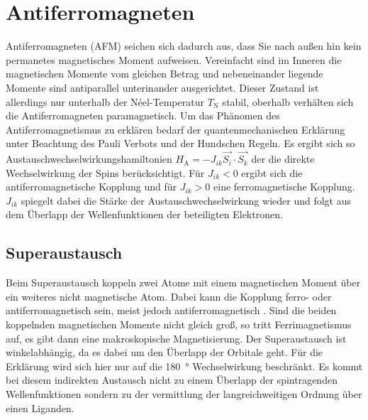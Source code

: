    \section{Antiferromagneten}
        Antiferromagneten (AFM) seichen sich dadurch aus, dass Sie nach außen hin kein permanetes magnetisches Moment aufweisen.
        Vereinfacht sind im Inneren die magnetischen Momente vom gleichen Betrag und nebeneinander liegende Momente sind antiparallel unterinander ausgerichtet.
        Dieser Zustand ist allerdings nur unterhalb der Néel-Temperatur $T_\text{N}$ stabil, oberhalb verhälten sich die Antiferromagneten paramagnetisch.
        Um das Phänomen des Antiferromagnetismus zu erklären bedarf der quantenmechanischen Erklärung unter Beachtung des Pauli Verbots und der Hundschen Regeln.
        Es ergibt sich so Austauschwechselwirkungshamiltonien $H_\text{A} = - J_{ik} \vec{S_i}\cdot\vec{S_k}$ der die direkte Wechselwirkung der Spins berücksichtigt.
        Für $J_{ik} < 0$ ergibt sich die antiferromagnetische Kopplung und für $J_{ik} > 0$ eine ferromagnetische Kopplung.
        $J_{ik}$ spiegelt dabei die Stärke der Austauschwechselwirkung wieder und folgt aus dem Überlapp der Wellenfunktionen der beteiligten Elektronen.


        \subsection{Superaustausch}
        \label{sec:Super}
            Beim Superaustausch koppeln zwei Atome mit einem magnetischen Moment über ein weiteres nicht magnetische Atom. 
            Dabei kann die Kopplung ferro- oder antiferromagnetisch sein, meist jedoch antiferromagnetisch \cite{AFM_1}.
            Sind die beiden koppelnden magnetischen Momente nicht gleich groß, so tritt Ferrimagnetismus auf, es gibt dann eine makroskopische Magnetisierung.
            Der Superaustausch ist winkelabhängig, da es dabei um den Überlapp der Orbitale geht.
            Für die Erklärung wird sich hier nur auf die \SI{180}{\degree} Wechselwirkung beschränkt.
            Es kommt bei diesem indirekten Austausch nicht zu einem Überlapp der spintragenden Wellenfunktionen sondern zu der vermittlung der langreichweitigen Ordnung über einen Liganden.

